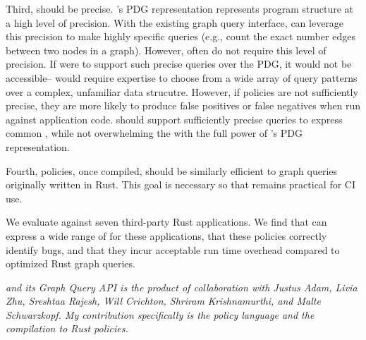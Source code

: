 Third, \syslang{} should be precise.
%
\sys{}'s PDG representation represents program structure at a high level of precision.
%
%
With the existing graph query interface, \writers{} can leverage this precision to make highly specific queries
(e.g., count the exact number edges between two nodes in a graph). 
%
However, \policies{} often do not require this level of precision.
%
If \syslang{} were to support such precise queries over the PDG, it would not be accessible--\ces{} would require expertise
to choose from a wide array of query patterns over a complex, unfamiliar data strucutre.
%
However, if policies are not sufficiently precise, they are more likely to produce false positives or false negatives when run against application code.
%
\syslang{} should support sufficiently precise queries to express common \policies{}, 
while not overwhelming the \writer{} with the full power of \sys{}'s PDG representation. 

Fourth, \syslang{} policies, once compiled, should be similarly efficient to graph queries originally written in Rust.
%
This goal is necessary so that \sys{} remains practical for CI use.

We evaluate \syslang{} against seven third-party Rust applications.
%
We find that \syslang{} can express a wide range of \policies{} for these applications,
that these policies correctly identify bugs,
and that they incur acceptable run time overhead compared to optimized Rust graph queries.
%

\emph{\sys{} and its Graph Query API is the product of collaboration with Justus Adam, Livia Zhu, Sreshtaa Rajesh, 
Will Crichton, Shriram Krishnamurthi, and Malte Schwarzkopf.
My contribution specifically is the \syslang{} policy language and the compilation to Rust policies.}

